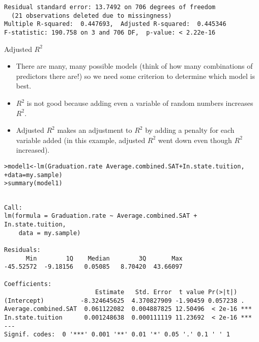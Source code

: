 \documentclass{beamer}\usepackage[]{graphicx}\usepackage[]{color}
\makeatletter
\newcommand{\hlopt}[1]{\textcolor[rgb]{1,0.894,0.769}{#1}}%
\newcommand{\hlstd}[1]{\textcolor[rgb]{1,0.894,0.769}{#1}}%
\newcommand{\hlkwb}[1]{\textcolor[rgb]{0.804,0.776,0.451}{#1}}%
\newcommand{\hlkwc}[1]{\textcolor[rgb]{0.78,0.941,0.545}{#1}}%
\newcommand{\hlkwd}[1]{\textcolor[rgb]{1,0.78,0.769}{#1}}%
\newenvironment{kframe}{%
 \def\at@end@of@kframe{}%
 \ifinner\ifhmode%
  \def\at@end@of@kframe{\end{minipage}}%
  \begin{minipage}{\columnwidth}%
 \fi\fi%
 \def\FrameCommand##1{\hskip\@totalleftmargin \hskip-\fboxsep
 \colorbox{shadecolor}{##1}\hskip-\fboxsep
     \hskip-\linewidth \hskip-\@totalleftmargin \hskip\columnwidth}%
 \MakeFramed {\advance\hsize-\width
   \@totalleftmargin\z@ \linewidth\hsize
   \@setminipage}}%
 {\par\unskip\endMakeFramed%
 \at@end@of@kframe}
\newenvironment{knitrout}{}{} %
\makeatother
\begin{document}
\begin{darkframes}
\begin{frame}[fragile]
\begin{knitrout}
\begin{kframe}
\begin{verbatim}
Residual standard error: 13.7492 on 706 degrees of freedom
  (21 observations deleted due to missingness)
Multiple R-squared:  0.447693,	Adjusted R-squared:  0.445346 
F-statistic: 190.758 on 3 and 706 DF,  p-value: < 2.22e-16
\end{verbatim}
\end{kframe}
\end{knitrout}
    \end{frame}

    \begin{frame}{Adjusted $R^2$}
      \begin{itemize}[<+->]
        \item There are many, many possible models (think of how many combinations of predictors there are!) so we need some criterion to determine which model is best.
        \item $R^2$ is not good because adding even a variable of random numbers increases $R^2$.
        \item \alert{Adjusted $R^2$} makes an adjustment to $R^2$ by adding a penalty for each variable added (in this example, adjusted $R^2$ went down even though $R^2$ increased).
      \end{itemize}
    \end{frame}

    \begin{frame}[fragile]
      
      \fontsize{8}{8}
\begin{knitrout}
\begin{kframe}
\begin{alltt}
\hlstd{> }\hlstd{model1} \hlkwb{<-} \hlkwd{lm}\hlstd{(Graduation.rate} \hlopt{~} \hlstd{Average.combined.SAT} \hlopt{+} \hlstd{In.state.tuition,}
\hlstd{+ }             \hlkwc{data}\hlstd{=my.sample)}
\hlstd{> }\hlkwd{summary}\hlstd{(model1)}
\end{alltt}
\begin{verbatim}

Call:
lm(formula = Graduation.rate ~ Average.combined.SAT + In.state.tuition, 
    data = my.sample)

Residuals:
      Min        1Q    Median        3Q       Max 
-45.52572  -9.18156   0.05085   8.70420  43.66097 

Coefficients:
                         Estimate   Std. Error  t value Pr(>|t|)    
(Intercept)          -8.324645625  4.370827909 -1.90459 0.057238 .  
Average.combined.SAT  0.061122082  0.004887825 12.50496  < 2e-16 ***
In.state.tuition      0.001248638  0.000111119 11.23692  < 2e-16 ***
---
Signif. codes:  0 '***' 0.001 '**' 0.01 '*' 0.05 '.' 0.1 ' ' 1


\end{verbatim}
\end{kframe}
\end{knitrout}
\end{frame}
\end{darkframes}
\end{document}
